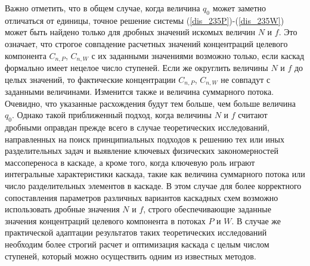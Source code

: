 Важно отметить, что в общем случае, когда величина $q_0$ может заметно отличаться от единицы, точное решение системы (\ref{dis_235P})-(\ref{dis_235W}) может быть найдено только для дробных значений искомых величин $N$ и $f$. Это означает, что строгое совпадение расчетных значений концентраций целевого компонента $C_{n,P}$, $C_{n,W}$ с их заданными значениями возможно только, если каскад формально имеет нецелое число ступеней. Если же округлить величины $N$ и $f$ до целых значений, то  фактические концентрации $C_{n,P}$, $C_{n,W}$ не совпадут с заданными величинами. Изменится также и величина суммарного потока. Очевидно, что указанные расхождения будут тем больше, чем больше величина $q_0$. Однако такой приближенный подход, когда величины $N$ и $f$ считают дробными оправдан прежде всего в случае теоретических исследований, направленных на поиск принципиальных подходов к решению тех или иных разделительных задач и выявление ключевых физических закономерностей массопереноса в каскаде, а кроме того, когда ключевую роль играют интегральные характеристики каскада, такие как величина суммарного потока или число разделительных элементов в каскаде. В этом случае для более корректного сопоставления параметров различных вариантов каскадных схем возможно использовать дробные значения $N$ и $f$, строго обеспечивающие заданные значения концентраций целевого компонента в потоках $P$ и $W$. В случае же практической адаптации результатов таких теоретических исследований необходим более строгий расчет и оптимизация каскада с целым числом ступеней, который можно осуществить одним из известных методов.   
